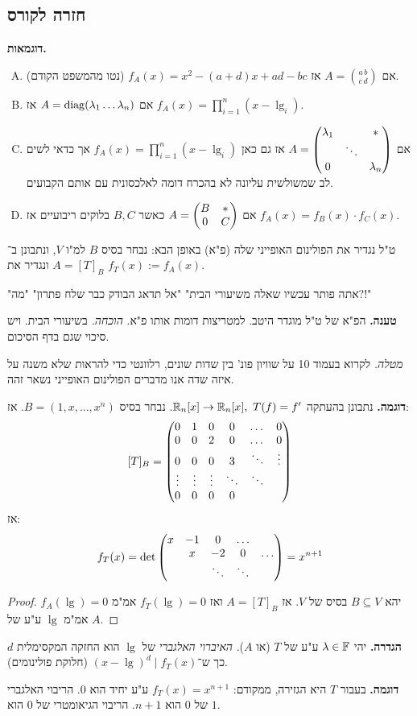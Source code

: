 \documentclass[]{../../../../tex/classes/styledArticle}
\begin{document}
	\subsection{חזרה לקורס}
	\textbf{דוגמאות. }\begin{enumerate}[A)]
		\item אם $A = \binom{a \, b}{c \, d}$ אז $f_A(x) = x^{2} - (a + d)x + ad - bc$ (נטו מהמשפט הקודם). 
		\item אם $A = \operatorname{diag}(\lambda_1 \dots \lambda_n)$ אז $f_A(x) = \prod_{i = 1}^{n}(x - \lg_i)$. 
		\item אם $A = \begin{pmatrix} \lambda_1 & & * \\ & \ddots & \\  0 && \lambda_n \end{pmatrix}$ אז גם כאן $f_A(x) = \prod_{i = 1}^{n}(x - \lg_i)$ אך כדאי לשים לב שמשולשית עליונה לא בהכרח דומה לאלכסונית עם אותם הקבועים. 
		\item אם $A = \begin{pmatrix} B & * \\ 0 & C \end{pmatrix}$ כאשר $B, C$ בלוקים ריבועיים אז $f_A(x) = f_B(x) \cdot f_C(x)$. 
	\end{enumerate}
	
	 ט"ל נגדיר את הפולינום האופייני שלה (פ"א) באופן הבא: נבחר בסיס $B$ למ"ו $V$, ונתבונן ב־$A = [T]_B$ ונגדיר את $f_T(x) := f_A(x)$. 
	
	"אתה פותר עכשיו שאלה משיעורי הבית" "אל תדאג הבודק כבר שלח פתרון" "מה?!"
	
	\textbf{טענה. }הפ"א של ט"ל מוגדר היטב. למטריצות דומות אותו פ"א. \textit{הוכחה. }בשיעורי הבית. ויש סיכוי שגם בדף הסיכום. 
	
	\textit{מטלה. }לקרוא בעמוד 10 על שוויון פונ' בין שדות שונים, רלוונטי כדי להראות שלא משנה על איזה שדה אנו מדברים הפולינום האופייני נשאר זהה. 
	
	\textbf{דוגמה. }נתבונן בהעתקה $\mathbb{R}_n[x] \to \mathbb{R}_n[x], \ T(f) = f'$. נבחר בסיס $B = (1, x, \dots, x^{n})$. אז: 
	\[ [T]_B = \begin{pmatrix} 0 & 1  & 0 & 0 & \dots & 0 \\ 0 & 0 & 2 & 0 & \dots & 0 \\ 0 & 0 & 0 & 3 & \ddots & \vdots \\ \vdots & \vdots & \vdots & \ddots & \ddots \\ 0 & 0 & 0 & 0  \end{pmatrix} \]
	אז: 
	\[ f_T(x) = \det\begin{pmatrix} x & -1 & 0 &\dots \\ & x & -2 & 0 &\dots \\ && \ddots &\ddots  \end{pmatrix} = x^{n + 1} \]
	\begin{proof}
		יהא $B \subseteq V$ בסיס של $V$. אז $A = [T]_B$ ואז $f_T(\lg) = 0$ אמ"מ $f_A(\lg) = 0$ אמ"מ $\lg$ ע"ע של $A$. 
	\end{proof}
	
	\textbf{הגדרה. }יהי $\lambda \in \mathbb{F}$ ע"ע של $T$ (או $A$). \textit{האיברוי האלגברי} של $\lg$ הוא החזקה המקסימלית $d$ כך ש־$(x - \lg)^{d} \mid f_T(x)$ (חלוקת פולינומים). 
	
	\textbf{דוגמה. }בעבור $T$ היא הגזירה, ממקודם: $f_T(x) = x^{n + 1}$ ע"ע יחיד הוא $0$. הריבוי האלגברי של $0$ הוא $n + 1$. הריבוי הגיאומטרי של $0$ הוא $1$. 
	
	
	\ndoc
\end{document}
